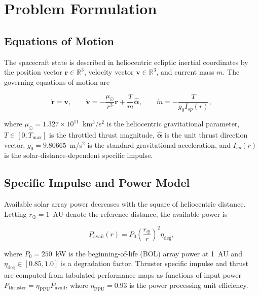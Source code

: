 \section{Problem Formulation}
\label{sec:formulation}

\subsection{Equations of Motion}

The spacecraft state is described in heliocentric ecliptic inertial
coordinates by the position vector $\mathbf{r} \in \mathbb{R}^3$, velocity
vector $\mathbf{v} \in \mathbb{R}^3$, and current mass $m$.  The governing
equations of motion are

\begin{equation}
  \dot{\mathbf{r}} = \mathbf{v},
  \qquad
  \dot{\mathbf{v}} = -\frac{\mu_\odot}{r^3}\mathbf{r}
                     + \frac{T}{m}\hat{\boldsymbol{\alpha}},
  \qquad
  \dot{m} = -\frac{T}{g_0 I_{sp}(r)},
  \label{eq:eom}
\end{equation}

\noindent where $\mu_\odot = 1.327 \times 10^{11}$~km$^3$/s$^2$ is the
heliocentric gravitational parameter, $T \in [0, T_{\max}]$ is the throttled
thrust magnitude, $\hat{\boldsymbol{\alpha}}$ is the unit thrust direction
vector, $g_0 = 9.80665$~m/s$^2$ is the standard gravitational acceleration,
and $I_{sp}(r)$ is the solar-distance-dependent specific impulse.

\subsection{Specific Impulse and Power Model}

Available solar array power decreases with the square of heliocentric distance.
Letting $r_\oplus = 1$~AU denote the reference distance, the available power is

\begin{equation}
  P_{\text{avail}}(r) = P_0 \left(\frac{r_\oplus}{r}\right)^{2} \eta_{\text{deg}},
  \label{eq:power}
\end{equation}

\noindent where $P_0 = 250$~kW is the beginning-of-life (BOL) array power at 1~AU
and $\eta_{\text{deg}} \in [0.85, 1.0]$ is a degradation factor.  Thruster
specific impulse and thrust are computed from tabulated performance maps as
functions of input power $P_{\text{thruster}} = \eta_{\text{PPU}} P_{\text{avail}}$,
where $\eta_{\text{PPU}} = 0.93$ is the power processing unit efficiency.

